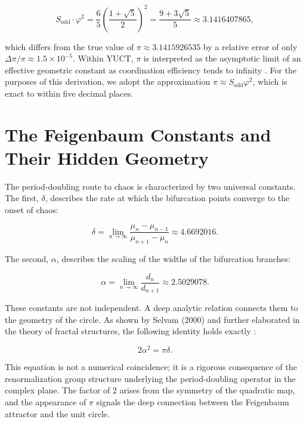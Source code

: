 \documentclass[12pt,a4paper]{article}
\begin{document}
{	\begin{equation}
		S_{\mathrm{odd}} \cdot \varphi^2 = \frac{6}{5} \left( \frac{1+\sqrt{5}}{2} \right)^2 = \frac{9+3\sqrt{5}}{5} \approx 3.1416407865,
	\end{equation}
	
	which differs from the true value of \(\pi \approx 3.1415926535\) by a relative error of only \(\Delta\pi/\pi \approx 1.5 \times 10^{-5}\). Within YUCT, \(\pi\) is interpreted as the asymptotic limit of an effective geometric constant as coordination efficiency tends to infinity \cite{AppendixEhrenfest}. For the purposes of this derivation, we adopt the approximation \(\pi \approx S_{\mathrm{odd}}\varphi^2\), which is exact to within five decimal places.
	
	\section{The Feigenbaum Constants and Their Hidden Geometry}
	
	The period-doubling route to chaos is characterized by two universal constants. The first, \(\delta\), describes the rate at which the bifurcation points converge to the onset of chaos:
	
	\begin{equation}
		\delta = \lim_{n\to\infty} \frac{\mu_n - \mu_{n-1}}{\mu_{n+1} - \mu_n} \approx 4.6692016.
	\end{equation}
	
	The second, \(\alpha\), describes the scaling of the widths of the bifurcation branches:
	
	\begin{equation}
		\alpha = \lim_{n\to\infty} \frac{d_n}{d_{n+1}} \approx 2.5029078.
	\end{equation}
	
	These constants are not independent. A deep analytic relation connects them to the geometry of the circle. As shown by Selvam (2000) and further elaborated in the theory of fractal structures, the following identity holds exactly \cite{Selvam2000}:
	
	\begin{equation}
		2\alpha^2 = \pi \delta.
		\label{eq:feigenbaum-pi}
	\end{equation}
	
	This equation is not a numerical coincidence; it is a rigorous consequence of the renormalization group structure underlying the period-doubling operator in the complex plane. The factor of 2 arises from the symmetry of the quadratic map, and the appearance of \(\pi\) signals the deep connection between the Feigenbaum attractor and the unit circle.
	
}
\end{document}
